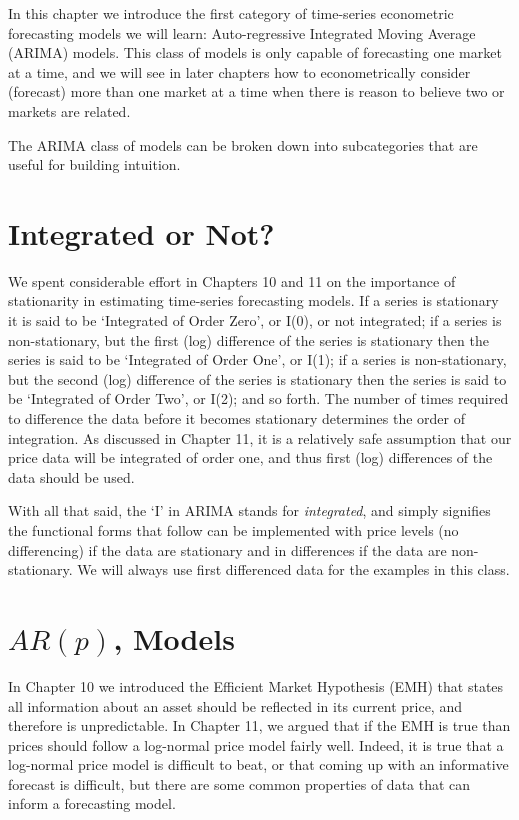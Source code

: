 \documentclass[
]{book}
\begin{document}
In this chapter we introduce the first category of time-series econometric forecasting models we will learn: Auto-regressive Integrated Moving Average (ARIMA) models. This class of models is only capable of forecasting one market at a time, and we will see in later chapters how to econometrically consider (forecast) more than one market at a time when there is reason to believe two or markets are related.

The ARIMA class of models can be broken down into subcategories that are useful for building intuition.

\hypertarget{integrated-or-not}{%
\section{Integrated or Not?}\label{integrated-or-not}}

We spent considerable effort in Chapters 10 and 11 on the importance of stationarity in estimating time-series forecasting models. If a series is stationary it is said to be `Integrated of Order Zero', or I(0), or not integrated; if a series is non-stationary, but the first (log) difference of the series is stationary then the series is said to be `Integrated of Order One', or I(1); if a series is non-stationary, but the second (log) difference of the series is stationary then the series is said to be `Integrated of Order Two', or I(2); and so forth. The number of times required to difference the data before it becomes stationary determines the order of integration. As discussed in Chapter 11, it is a relatively safe assumption that our price data will be integrated of order one, and thus first (log) differences of the data should be used.

With all that said, the `I' in ARIMA stands for \emph{integrated}, and simply signifies the functional forms that follow can be implemented with price levels (no differencing) if the data are stationary and in differences if the data are non-stationary. We will always use first differenced data for the examples in this class.

\hypertarget{arp-models}{%
\section{\texorpdfstring{\(AR(p)\), Models}{AR(p), Models}}\label{arp-models}}

In Chapter 10 we introduced the Efficient Market Hypothesis (EMH) that states all information about an asset should be reflected in its current price, and therefore is unpredictable. In Chapter 11, we argued that if the EMH is true than prices should follow a log-normal price model fairly well. Indeed, it is true that a log-normal price model is difficult to beat, or that coming up with an informative forecast is difficult, but there are some common properties of data that can inform a forecasting model.
\end{document}
